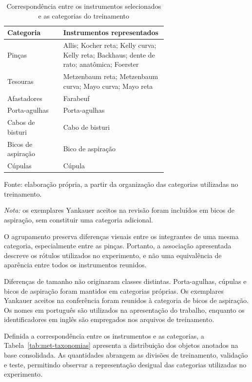 \begin{table}[htbp]
\centering
\begin{minipage}{0.95\linewidth}
\singlespacing\small
\caption{Correspondência entre os instrumentos selecionados e as categorias do treinamento}
\label{tab:met-correspondencia}
\centering
\begin{tabular}{lp{0.65\linewidth}}
\hline
Categoria & Instrumentos representados \\
\hline
Pinças & Allis; Kocher reta; Kelly curva; Kelly reta; Backhaus; dente de rato; anatômica; Foerster \\
Tesouras & Metzenbaum reta; Metzenbaum curva; Mayo curva; Mayo reta \\
Afastadores & Farabeuf \\
Porta-agulhas & Porta-agulhas \\
Cabos de bisturi & Cabo de bisturi \\
Bicos de aspiração & Bico de aspiração \\
Cúpulas & Cúpula \\
\hline
\end{tabular}\par
\vspace{0.35em}
\raggedright
Fonte: elaboração própria, a partir da organização das categorias utilizadas no treinamento.\par
\vspace{0.25em}
\textit{Nota:} os exemplares Yankauer aceitos na revisão foram incluídos em bicos de aspiração, sem constituir uma categoria adicional.
\end{minipage}
\end{table}


O agrupamento preserva diferenças visuais entre os integrantes de uma mesma categoria, especialmente entre as pinças. Portanto, a associação apresentada descreve os rótulos utilizados no experimento, e não uma equivalência de aparência entre todos os instrumentos reunidos.

Diferenças de tamanho não originaram classes distintas. Porta-agulhas, cúpulas e bicos de aspiração foram mantidos em categorias próprias. Os exemplares Yankauer aceitos na conferência foram reunidos à categoria de bicos de aspiração. Os nomes em português são utilizados na apresentação do trabalho, enquanto os identificadores em inglês são empregados nos arquivos de treinamento.


Definida a correspondência entre os instrumentos e as categorias, a Tabela~\ref{tab:met-taxonomias} apresenta a distribuição dos objetos anotados na base consolidada. As quantidades abrangem as divisões de treinamento, validação e teste, permitindo observar a representação desigual das categorias utilizadas no experimento.


